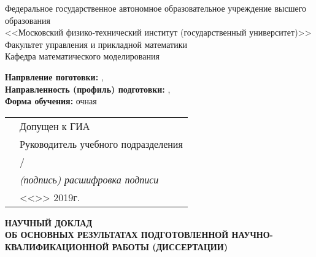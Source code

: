 \thispagestyle{empty}
\begin{center}
Федеральное государственное автономное образовательное учреждение высшего
образования \\
<<Московский физико-технический институт (государственный университет)>> \\
Факультет управления и прикладной математики \\
Кафедра математического моделирования \\
\end{center}

\vspace{0pt plus1fill}
\begin{small}
\begin{flushleft}
\textbf {Напрвление поготовки:} \thesisSpecialtyNumber, \thesisSpecialtyTitle \\
\textbf {Направленность (профиль) подготовки:} \thesisSpecialtyTwoNumber, \thesisSpecialtyTwoTitle \\
\textbf {Форма обучения:} очная
\end{flushleft}

\begin{flushright}
  \begin{tabularx}{\textwidth}{XX}
    &Допущен к ГИА \\
    &Руководитель учебного подразделения \\
    &\underline{\hspace{3cm}}/\underline{\hspace{4cm}} \\
    &\hspace{1cm}\textit {(подпись) расшифровка подписи} \\
    & <<\underline {\hspace{1cm}}>> \underline {\hspace{3cm}} 2019г.
  \end{tabularx}
\end{flushright}

\vspace{0pt plus3fill}
\begin{center}
\textbf {НАУЧНЫЙ ДОКЛАД} \\
\textbf {ОБ ОСНОВНЫХ РЕЗУЛЬТАТАХ ПОДГОТОВЛЕННОЙ НАУЧНО-КВАЛИФИКАЦИОННОЙ РАБОТЫ (ДИССЕРТАЦИИ)}

\vspace{0pt plus2fill}

\textbf {\thesisTitle}
\end{center}


\end{small}
